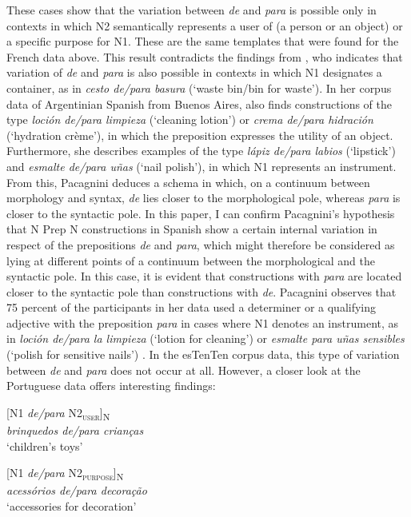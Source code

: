 \documentclass[output=paper]{langsci/langscibook}
\begin{document}
These cases show that the variation between \textit{de} and \textit{para} is possible only in contexts in which N2 semantically represents a user of (a person or an object) or a specific purpose for N1. These are the same templates that were found for the French data above. This result contradicts the findings from \citet{Lopez:1970}, who indicates that variation of \textit{de} and \textit{para} is also possible in contexts in which N1 designates a container, as in \textit{cesto de/para basura} (`waste bin/bin for waste'). In her corpus data of Argentinian Spanish from Buenos Aires, \citet[164]{Pacagnini:2003} also finds constructions of the type \textit{loción de/para limpieza} (`cleaning lotion') or \textit{crema de/para hidración} (`hydration crème'), in which the preposition expresses the utility of an object. Furthermore, she describes examples of the type \textit{lápiz de/para labios} (`lipstick') and \textit{esmalte de/para uñas} (`nail polish'), in which N1 represents an instrument. From this, Pacagnini deduces a schema in which, on a continuum between morphology and syntax, \textit{de} lies closer to the morphological pole, whereas \textit{para} is closer to the syntactic pole. In this paper, I can confirm Pacagnini’s hypothesis that N Prep N constructions in Spanish show a certain internal variation in respect of the prepositions \textit{de} and \textit{para}, which might therefore be considered as lying at different points of a continuum between the morphological and the syntactic pole. In this case, it is evident that constructions with \textit{para} are located closer to the syntactic pole than constructions with \textit{de}. Pacagnini observes that 75 percent of the participants in her data used a determiner or a qualifying adjective with the preposition \textit{para} in cases where N1 denotes an instrument, as in \textit{loción de/para la limpieza} (`lotion for cleaning') or \textit{esmalte para uñas sensibles} (`polish for sensitive nails') \citep[166]{Pacagnini:2003}. In the esTenTen corpus data, this type of variation between \textit{de} and \textit{para} does not occur at all. However, a closer look at the Portuguese data offers interesting findings:

\begin{exe}\ex\begin{minipage}[t]{0.4\textwidth}    %
[N1 \textit{de/para} N2\textsubscript{\scshape user}]\textsubscript{N}\\
\textit{brinquedos de/para crianças}\\
`children’s toys'
\end{minipage}\hfill%
\begin{minipage}[t]{0.45\textwidth}
[N1 \textit{de/para} N2\textsubscript{\scshape purpose}]\textsubscript{N}\\
\textit{acessórios de/para decoração}\\
`accessories for decoration'
\end{minipage}
\end{exe}
\end{document}
